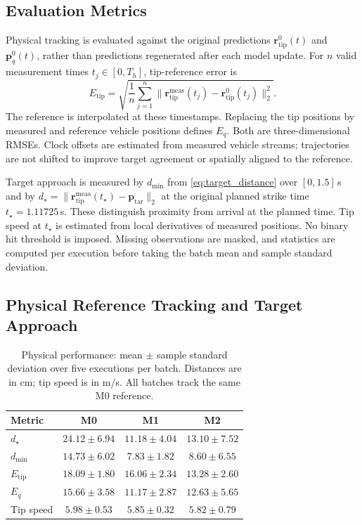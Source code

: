 \subsection{Evaluation Metrics}
\label{subsec:experimental_metrics}

Physical tracking is evaluated against the original predictions
$\mathbf r_{\mathrm{tip}}^0(t)$ and $\mathbf p_q^0(t)$, rather
than predictions regenerated after each model update.
For $n$ valid measurement times $t_j\in[0,T_h]$, tip-reference
error is
\[
E_{\mathrm{tip}}=
\sqrt{\frac{1}{n}\sum_{j=1}^{n}
\|\mathbf r_{\mathrm{tip}}^{\mathrm{meas}}(t_j)
-\mathbf r_{\mathrm{tip}}^0(t_j)\|_2^2}.
\]
The reference is interpolated at these timestamps.
Replacing the tip positions by measured and reference vehicle
positions defines $E_q$. Both are three-dimensional RMSEs.
Clock offsets are estimated from measured vehicle streams;
trajectories are not shifted to improve target agreement or
spatially aligned to the reference.

Target approach is measured by $d_{\min}$ from
\eqref{eq:target_distance} over $[0,1.5]$\,s and by
$d_\star=\|\mathbf r_{\mathrm{tip}}^{\mathrm{meas}}(t_\star)
-\mathbf p_{\mathrm{tar}}\|_2$ at the original planned strike
time $t_\star=1.11725$\,s. These distinguish proximity from
arrival at the planned time. Tip speed at $t_\star$ is estimated
from local derivatives of measured positions. No binary hit
threshold is imposed. Missing observations are masked, and
statistics are computed per execution before taking the
batch mean and sample standard deviation.

\subsection{Physical Reference Tracking and Target Approach}
\label{subsec:physical_results}

\begin{table}[t]
\centering
\caption{Physical performance: mean $\pm$ sample standard
deviation over five executions per batch. Distances are in cm;
tip speed is in m/s. All batches track the same M0 reference.}
\label{tab:physical_performance}
\small
\setlength{\tabcolsep}{3pt}
\begin{tabular}{@{}lccc@{}}
\toprule
Metric & M0 & M1 & M2 \\
\midrule
$d_\star$ & $24.12\pm6.94$ & $11.18\pm4.04$ & $13.10\pm7.52$ \\
$d_{\min}$ & $14.73\pm6.02$ & $7.83\pm1.82$ & $8.60\pm6.55$ \\
$E_{\mathrm{tip}}$ & $18.09\pm1.80$ & $16.06\pm2.34$ & $13.28\pm2.60$ \\
$E_q$ & $15.66\pm3.58$ & $11.17\pm2.87$ & $12.63\pm5.65$ \\
Tip speed & $5.98\pm0.53$ & $5.85\pm0.32$ & $5.82\pm0.79$ \\
\bottomrule
\end{tabular}
\end{table}

